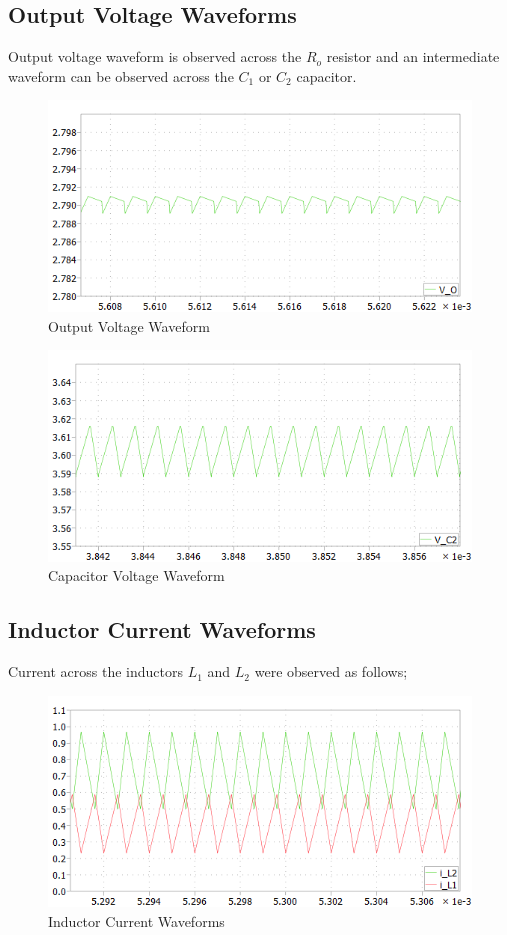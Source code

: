 \documentclass[12pt]{article}
\begin{document}
\pagebreak 
\subsection{Output Voltage Waveforms}
Output voltage waveform is observed across the $R_o$ resistor and an intermediate waveform can be observed across the $C_1$ or $C_2$ capacitor.

\begin{figure}[h]
\caption{Output Voltage Waveform}
\includegraphics[scale=0.8]{images/v_o_graph.png}
\end{figure}

\begin{figure}[h]
\caption{Capacitor Voltage Waveform}
\includegraphics[scale=0.8]{images/v_c_graph.png}
\end{figure}

\pagebreak 
\subsection{Inductor Current Waveforms}
Current across the inductors $L_1$ and $L_2$ were observed as follows;

\begin{figure}[h]
\caption{Inductor Current Waveforms}
\includegraphics[scale=0.8]{images/i_l_graph.png}
\end{figure}
\end{document}
